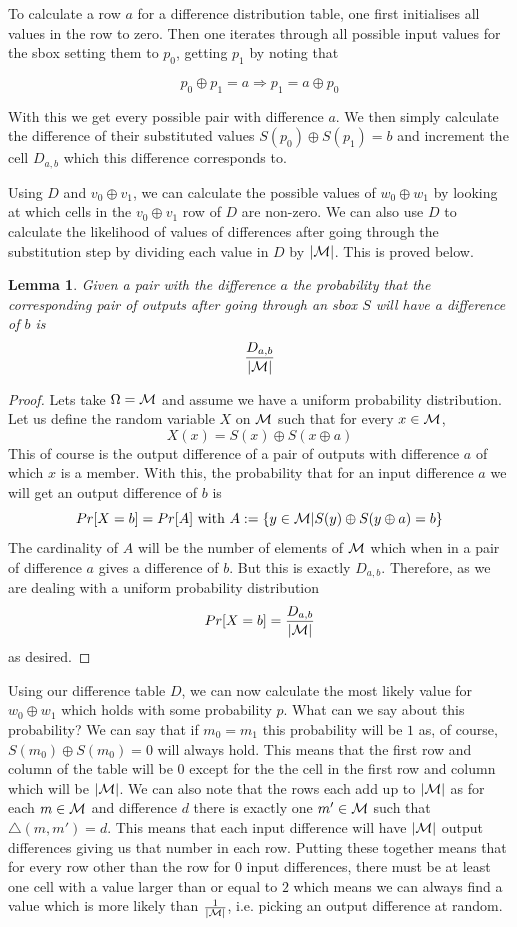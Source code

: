 \documentclass[12pt,a4paper]{article}
\newtheorem{lemma}[theorem]{Lemma}
\begin{document}
To calculate a row $a$ for a difference distribution table, one
first initialises all values in the row to zero. Then one iterates through all
possible input values for the sbox setting them to $p_0$, getting $p_1$ by
noting that 

\[p_0 \oplus p_1 = a \Rightarrow p_1 = a \oplus p_0\]

With this we get every possible pair with difference $a$. We then simply calculate
the difference of their substituted values $S(p_0) \oplus S(p_1)=b$ and increment
the cell $D_{a,b}$ which this difference corresponds to.

Using $D$ and $v_0 \oplus v_1$, we can calculate the possible values of $w_0
\oplus w_1$ by looking at which cells in the $v_0 \oplus v_1$ row of $D$ are
non-zero. We can also use $D$ to calculate the likelihood of values
of differences after going through the substitution step by dividing each value
in $D$ by $|\cal{M}|$. This is proved below.

\begin{lemma}
Given a pair with the difference $a$ the probability that the corresponding
pair of outputs after going through an sbox $S$ will have a difference of $b$
is 
\[\frac{D_{a,b}}{|\cal{M}|}\]
\end{lemma}
\begin{proof}
Lets take $\Omega = \cal{M}$ and assume we have a uniform probability
distribution. Let us define the random variable $X$ on $\cal{M}$ such that for
every $x \in \cal{M}$,
\[X(x) = S(x) \oplus S(x\oplus a)\]
This of course is the output difference of a pair of outputs with difference
$a$ of which $x$ is a member. With this, the probability that for an input
difference $a$ we will get an output difference of $b$ is 
\[Pr[X=b] = Pr[A] \mbox{ with } A:= \{y \in {\cal{M}} | S(y) \oplus S(y \oplus a) =
b\}\]
The cardinality of $A$ will be the number of elements of $\cal{M}$ which when
in a pair of difference $a$ gives a difference of $b$. But this is exactly
$D_{a,b}$. Therefore, as we are dealing with a uniform probability distribution
\[Pr[X=b] = \frac{D_{a,b}}{|\cal{M}|}\]
as desired.
\end{proof}

Using our difference table $D$, we can now calculate the most likely value for
$w_0 \oplus w_1$ which holds with some probability $p$. What can we say about
this probability?  We can say that if $m_0 = m_1$ this probability will be $1$
as, of course, $S(m_0)\oplus S(m_0) = 0$ will always hold. This means that the
first row and column of the table will be 0 except for the the cell in the
first row and column which will be $|\cal{M}|$. We can also note that the rows
each add up to $|\cal{M}|$ as for each $m \in \cal{M}$ and difference $d$ there is exactly one $m'
\in \cal{M}$ such that $\triangle(m,m')=d$. This means that each input
difference will have $|\cal{M}|$ output differences giving us that number in
each row. Putting these together means that for every row other than the row
for 0 input differences, there must be at least one cell with a value larger
than or equal to $2$ which means
we can always find a value which is more likely than $\frac{1}{|\cal{M}|}$,
i.e. picking an output difference at random.
\end{document}

